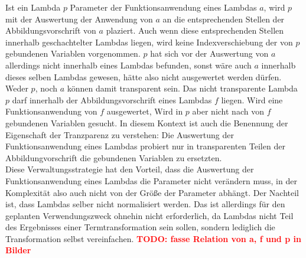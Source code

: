 \documentclass{scrartcl}
\numberwithin{figure}{section} %
\theoremstyle{definition} %
\newcommand{\BFred}[1]{\textbf{\textcolor{red}{#1}}}
\begin{document}
Ist ein Lambda $p$ Parameter der Funktionsanwendung eines Lambdas $a$, wird $p$ mit der Auswertung der Anwendung von $a$ an die entsprechenden Stellen der Abbildungsvorschrift von $a$ plaziert. Auch wenn diese entsprechenden Stellen innerhalb geschachtelter Lambdas liegen, wird keine Indexverschiebung der von $p$ gebundenen Variablen vorgenommen. $p$ hat sich vor der Auswertung von $a$ allerdings nicht innerhalb eines Lambdas befunden, sonst wäre auch $a$ innerhalb dieses selben Lambdas gewesen, hätte also nicht ausgewertet werden dürfen. Weder $p$, noch $a$ können damit transparent sein. Das nicht transparente Lambda $p$ darf innerhalb der Abbildungsvorschrift eines Lambdas $f$ liegen. Wird eine Funktionsanwendung von $f$ ausgewertet, Wird in $p$ aber nicht nach von $f$ gebundenen Variablen gesucht. In diesem Kontext ist auch die Benennung der Eigenschaft der Tranzparenz zu verstehen: Die Auswertung der Funktionsanwendung eines Lambdas probiert nur in transparenten Teilen der Abbildungvorschrift die gebundenen Variablen zu ersetzten.\\
Diese Verwaltungsstrategie hat den Vorteil, dass die Auswertung der Funktionsanwendung eines Lambdas die Parameter nicht verändern muss, in der Komplexität also auch nicht von der Größe der Parameter abhängt. Der Nachteil ist, dass Lambdas selber nicht normalisiert werden. Das ist allerdings für den geplanten Verwendungszweck ohnehin nicht erforderlich, da Lambdas nicht Teil des Ergebnisses einer Termtransformation sein sollen, sondern lediglich die Transformation selbst vereinfachen. \BFred{TODO: fasse Relation von a, f und p in Bilder}



\end{document}
